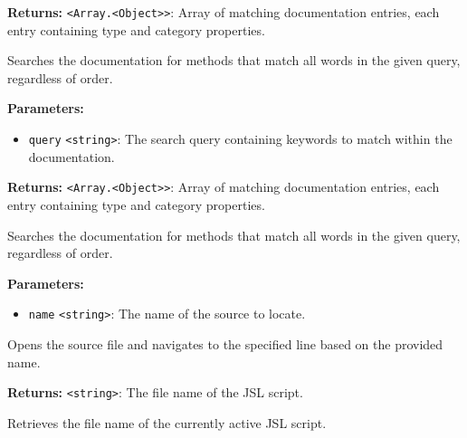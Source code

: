\documentclass[12pt,a4paper]{article}
\begin{document}
\noindent \textbf{Returns:} \texttt{<Array.<Object>>}: Array of matching documentation entries, each entry containing \textasciigrave{}type\textasciigrave{} and \textasciigrave{}category\textasciigrave{} properties.

\noindent Searches the documentation for methods that match all words in the given query, regardless of order.

\vspace{5mm}
\noindent {}


\noindent \textbf{Parameters:}
\begin{itemize}
  \item \texttt{query} \texttt{<string>}: The search query containing keywords to match within the documentation.
\end{itemize}

\noindent \textbf{Returns:} \texttt{<Array.<Object>>}: Array of matching documentation entries, each entry containing \textasciigrave{}type\textasciigrave{} and \textasciigrave{}category\textasciigrave{} properties.

\noindent Searches the documentation for methods that match all words in the given query, regardless of order.

\vspace{5mm}
\noindent {}


\noindent \textbf{Parameters:}
\begin{itemize}
  \item \texttt{name} \texttt{<string>}: The name of the source to locate.
\end{itemize}

\noindent Opens the source file and navigates to the specified line based on the provided name.

\vspace{5mm}
\noindent {}


\noindent \textbf{Returns:} \texttt{<string>}: The file name of the JSL script.

\noindent Retrieves the file name of the currently active JSL script.
\end{document}
